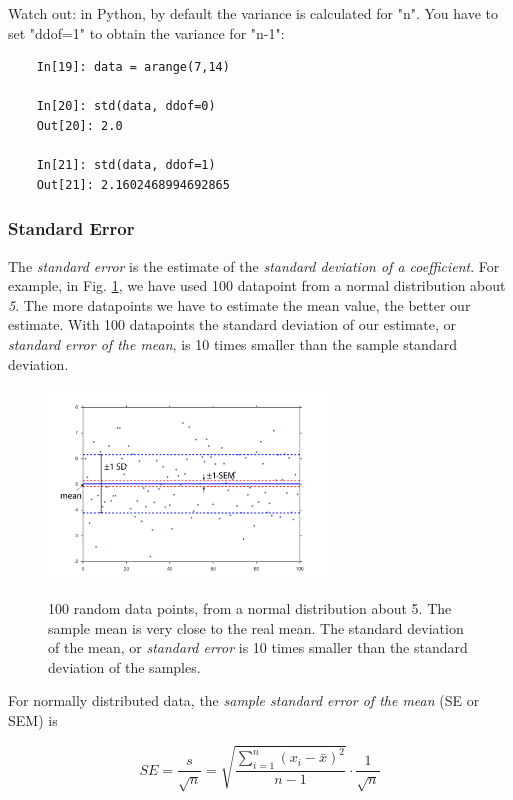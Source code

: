 Watch out: in Python, by default the variance is calculated for "n". You have to set "ddof=1" to obtain the variance for "n-1":

\begin{lstlisting}
    In[19]: data = arange(7,14)

    In[20]: std(data, ddof=0)
    Out[20]: 2.0

    In[21]: std(data, ddof=1)
    Out[21]: 2.1602468994692865
\end{lstlisting}

\subsubsection{Standard Error} 

The \emph{standard error} is the estimate of the \emph{standard deviation of a coefficient}. For example, in Fig. \ref{fig:sem}, we have used 100 datapoint from a normal distribution about \emph{5}. The more datapoints we have to estimate the mean value, the better our estimate. With 100 datapoints the standard deviation of our estimate, or \emph{standard error of the mean}, is 10 times smaller than the sample standard deviation.

\begin{figure}[ht]
  \centering
  \includegraphics[width=0.66\textwidth]{../Images/standardError.jpg}\\
  \caption{100 random data points, from a normal distribution about 5. The sample mean is very close to the real mean. The standard deviation of the mean, or \emph{standard error} is 10 times smaller than the standard deviation of the samples.}
  \label{fig:sem}
\end{figure}

For normally distributed data, the \emph{sample standard error of the mean} (SE or SEM) is

\begin{equation}
  SE = \frac{s}{\sqrt{n}} = \sqrt{\frac{{\sum\limits_{i = 1}^n {({x_i-\bar{x}})^2} }}{n-1}} \cdot \frac{1}{\sqrt{n}}
\end{equation}

